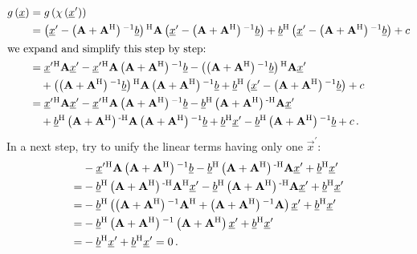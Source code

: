 \documentclass[a4paper,10pt]{article}
\begin{document}
\begin{equation*}
\begin{split}
  g\left(\vec{x}\right)
  & =g\left(\chi\left(\vec{x}^{\prime}\right)\right) \\
  & = \left(\vec{x}^{\prime} - \left(\mat{A} + \mat{A}\H\right)\inv \vec{b}\right)\H
      \mat{A}
      \left(\vec{x}^{\prime} - \left(\mat{A} + \mat{A}\H\right)\inv \vec{b}\right)
      + \vec{b}\H \left(\vec{x}^{\prime} - \left(\mat{A} + \mat{A}\H\right)\inv \vec{b}\right)
      + c \\
\intertext{we expand and simplify this step by step:}
  & =   \vec{x}^{\prime}\H \mat{A} \vec{x}^{\prime}
      - \vec{x}^{\prime}\H \mat{A} \left(\mat{A} + \mat{A}\H\right)\inv \vec{b}
      - \left(\left(\mat{A} + \mat{A}\H\right)\inv \vec{b}\right)\H \mat{A} \vec{x}^{\prime} \\
  & \quad
      + \left(\left(\mat{A} + \mat{A}\H\right)\inv \vec{b}\right)\H \mat{A} \left(\mat{A} + \mat{A}\H\right)\inv \vec{b}
      + \vec{b}\H \left(\vec{x}^{\prime} - \left(\mat{A} + \mat{A}\H\right)\inv \vec{b}\right)
      + c \\
  & =   \vec{x}^{\prime}\H \mat{A} \vec{x}^{\prime}
      - \vec{x}^{\prime}\H \mat{A} \left(\mat{A} + \mat{A}\H\right)\inv \vec{b}
      - \vec{b}\H \left(\mat{A} + \mat{A}\H\right)\Hinv \mat{A} \vec{x}^{\prime} \\
  & \quad
      + \vec{b}\H \left(\mat{A} + \mat{A}\H\right)\Hinv \mat{A} \left(\mat{A} + \mat{A}\H\right)\inv \vec{b}
      + \vec{b}\H \vec{x}^{\prime} - \vec{b}\H \left(\mat{A} + \mat{A}\H\right)\inv \vec{b}
      + c \,.
\end{split}
\end{equation*}
In a next step, try to unify the linear terms having only one $\vec{x}^{\prime}$:
\begin{equation*}
\begin{split}
   &- \vec{x}^{\prime}\H \mat{A} \left(\mat{A} + \mat{A}\H\right)\inv \vec{b}
    - \vec{b}\H \left(\mat{A} + \mat{A}\H\right)\Hinv \mat{A} \vec{x}^{\prime}
    + \vec{b}\H \vec{x}^{\prime} \\
 = &- \vec{b}\H \left(\mat{A} + \mat{A}\H\right)\Hinv \mat{A}\H \vec{x}^{\prime}
    - \vec{b}\H \left(\mat{A} + \mat{A}\H\right)\Hinv \mat{A} \vec{x}^{\prime}
    + \vec{b}\H \vec{x}^{\prime} \\
 = &- \vec{b}\H
      \left(
        \left(\mat{A} + \mat{A}\H\right)\inv \mat{A}\H
      + \left(\mat{A} + \mat{A}\H\right)\inv \mat{A}
      \right)
      \vec{x}^{\prime}
    + \vec{b}\H \vec{x}^{\prime} \\
 = &- \vec{b}\H
      \left(\mat{A} + \mat{A}\H\right)\inv
      \left(\mat{A} + \mat{A}\H\right)
      \vec{x}^{\prime}
    + \vec{b}\H \vec{x}^{\prime} \\
 = &- \vec{b}\H \vec{x}^{\prime}
    + \vec{b}\H \vec{x}^{\prime} = 0 \,.
\end{split}
\end{equation*}
\end{document}
